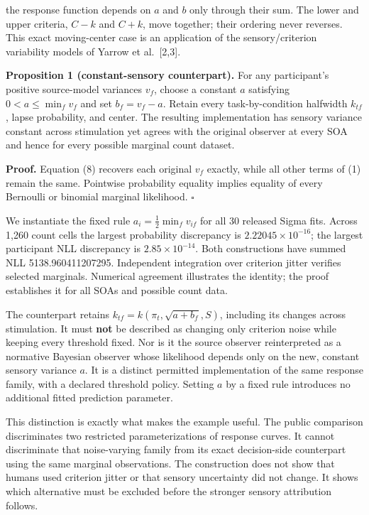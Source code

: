 \documentclass[
  11pt,
]{article}
\begin{document}
the response function depends on \(a\) and \(b\) only through their sum.
The lower and upper criteria, \(C-k\) and \(C+k\), move together; their
ordering never reverses. This exact moving-center case is an application
of the sensory/criterion variability models of Yarrow et al.~{[}2,3{]}.

\textbf{Proposition 1 (constant-sensory counterpart).} For any
participant's positive source-model variances \(v_f\), choose a constant
\(a\) satisfying \(0<a\leq\min_f v_f\) and set \(b_f=v_f-a\). Retain
every task-by-condition halfwidth \(k_{tf}\), lapse probability, and
center. The resulting implementation has sensory variance constant
across stimulation yet agrees with the original observer at every SOA
and hence for every possible marginal count dataset.

\textbf{Proof.} Equation (8) recovers each original \(v_f\) exactly,
while all other terms of (1) remain the same. Pointwise probability
equality implies equality of every Bernoulli or binomial marginal
likelihood. \(\square\)

We instantiate the fixed rule \(a_i=\tfrac12\min_f v_{if}\) for all 30
released Sigma fits. Across 1,260 count cells the largest probability
discrepancy is \(2.22045\times10^{-16}\); the largest participant NLL
discrepancy is \(2.85\times10^{-14}\). Both constructions have summed
NLL 5138.960411207295. Independent integration over criterion jitter
verifies selected marginals. Numerical agreement illustrates the
identity; the proof establishes it for all SOAs and possible count data.

The counterpart retains \(k_{tf}=k(\pi_t,\sqrt{a+b_f},S)\), including
its changes across stimulation. It must \textbf{not} be described as
changing only criterion noise while keeping every threshold fixed. Nor
is it the source observer reinterpreted as a normative Bayesian observer
whose likelihood depends only on the new, constant sensory variance
\(a\). It is a distinct permitted implementation of the same response
family, with a declared threshold policy. Setting \(a\) by a fixed rule
introduces no additional fitted prediction parameter.

This distinction is exactly what makes the example useful. The public
comparison discriminates two restricted parameterizations of response
curves. It cannot discriminate that noise-varying family from its exact
decision-side counterpart using the same marginal observations. The
construction does not show that humans used criterion jitter or that
sensory uncertainty did not change. It shows which alternative must be
excluded before the stronger sensory attribution follows.
\end{document}
